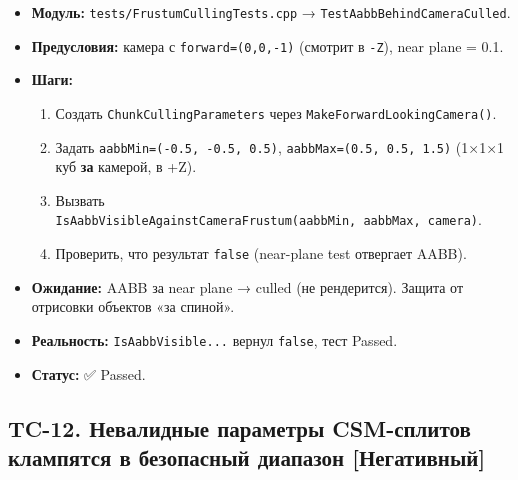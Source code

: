 \documentclass[
  11pt,a4paper,oneside]{article}
\providecommand{\tightlist}{%
  \setlength{\itemsep}{0pt}\setlength{\parskip}{0pt}}
\providecommand{\tightlist}{%
  \setlength{\itemsep}{0pt}\setlength{\parskip}{0pt}}
\begin{document}
\begin{itemize}
\tightlist
\item
  \textbf{Модуль:} \texttt{tests/FrustumCullingTests.cpp} → \texttt{TestAabbBehindCameraCulled}.
\item
  \textbf{Предусловия:} камера с \texttt{forward=(0,0,-1)} (смотрит в \texttt{-Z}), near plane = 0.1.
\item
  \textbf{Шаги:}

  \begin{enumerate}
  \def\labelenumi{\arabic{enumi}.}
  \tightlist
  \item
    Создать \texttt{ChunkCullingParameters} через \texttt{MakeForwardLookingCamera()}.
  \item
    Задать \texttt{aabbMin=(-0.5,\ -0.5,\ 0.5)}, \texttt{aabbMax=(0.5,\ 0.5,\ 1.5)} (1×1×1 куб \textbf{за} камерой, в +Z).
  \item
    Вызвать \texttt{IsAabbVisibleAgainstCameraFrustum(aabbMin,\ aabbMax,\ camera)}.
  \item
    Проверить, что результат \texttt{false} (near-plane test отвергает AABB).
  \end{enumerate}
\item
  \textbf{Ожидание:} AABB за near plane → culled (не рендерится). Защита от отрисовки объектов «за спиной».
\item
  \textbf{Реальность:} \texttt{IsAabbVisible...} вернул \texttt{false}, тест Passed.
\item
  \textbf{Статус:} ✅ Passed.
\end{itemize}

\subsection{TC-12. Невалидные параметры CSM-сплитов клампятся в безопасный диапазон {[}Негативный{]}}\label{tc-12-ux43dux435ux432ux430ux43bux438ux434ux43dux44bux435-ux43fux430ux440ux430ux43cux435ux442ux440ux44b-csm-ux441ux43fux43bux438ux442ux43eux432-ux43aux43bux430ux43cux43fux44fux442ux441ux44f-ux432-ux431ux435ux437ux43eux43fux430ux441ux43dux44bux439-ux434ux438ux430ux43fux430ux437ux43eux43d-ux43dux435ux433ux430ux442ux438ux432ux43dux44bux439}
\end{document}
